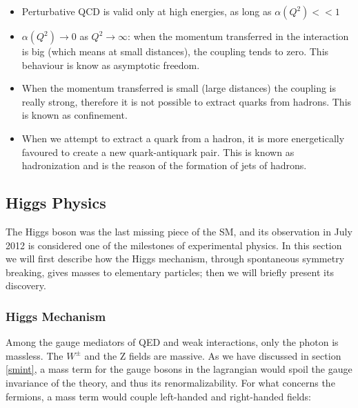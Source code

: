 \begin{itemize}
\item Perturbative QCD is valid only at high energies, as long as $\alpha(Q^2) << 1$
\item $\alpha(Q^2) \rightarrow 0$ as $Q^2 \rightarrow \infty $: when the momentum transferred in the interaction is big (which means at small distances), the coupling tends to zero. This behaviour is know as asymptotic freedom.
\item When the momentum transferred is small (large distances) the coupling is really strong, therefore it is not possible to extract quarks from hadrons. This is known as confinement. 
\item When we attempt to extract a quark from a hadron, it is more energetically favoured to create a new quark-antiquark pair. This is known as hadronization and is the reason of the formation of jets of hadrons.
\end{itemize}





\subsection{Higgs Physics}
\label{sec:H}

The Higgs boson was the last missing piece of the SM, and its observation in July 2012 is considered one of the milestones of experimental physics. In this section we will first describe how the Higgs mechanism, through spontaneous symmetry breaking, gives masses to elementary particles; then we will briefly present its discovery.

\subsubsection{Higgs Mechanism}

Among the gauge mediators of QED and weak interactions, only the photon is massless. The $W^\pm$ and the Z fields are massive. As we have discussed in section \ref{smint}, a mass term for the gauge bosons in the lagrangian would spoil the gauge invariance of the theory, and thus its renormalizability. For what concerns the fermions, a mass term would couple left-handed and right-handed fields: 

